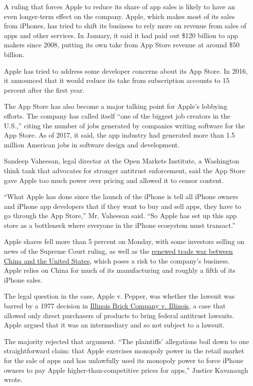 A ruling that forces Apple to reduce its share of app sales is likely to
have an even longer-term effect on the company. Apple, which makes most
of its sales from iPhones, has tried to shift its business to rely more
on revenue from sales of apps and other services. In January, it said it
had paid out \$120 billion to app makers since 2008, putting its own
take from App Store revenue at around \$50 billion.

Apple has tried to address some developer concerns about its App Store.
In 2016, it announced that it would reduce its take from subscription
accounts to 15 percent after the first year.

The App Store has also become a major talking point for Apple's lobbying
efforts. The company has called itself ``one of the biggest job creators
in the U.S.,'' citing the number of jobs generated by companies writing
software for the App Store. As of 2017, it said, the app industry had
generated more than 1.5 million American jobs in software design and
development.

Sandeep Vaheesan, legal director at the Open Markets Institute, a
Washington think tank that advocates for stronger antitrust enforcement,
said the App Store gave Apple too much power over pricing and allowed it
to censor content.

``What Apple has done since the launch of the iPhone is tell all iPhone
owners and iPhone app developers that if they want to buy and sell apps,
they have to go through the App Store,'' Mr. Vaheesan said. ``So Apple
has set up this app store as a bottleneck where everyone in the iPhone
ecosystem must transact.''

Apple shares fell more than 5 percent on Monday, with some investors
selling on news of the Supreme Court ruling, as well as the
\href{https://www.nytimes3xbfgragh.onion/2019/05/13/business/trump-trade-china.html}{renewed
trade war between China and the United States}, which poses a risk to
the company's business. Apple relies on China for much of its
manufacturing and roughly a fifth of its iPhone sales.

The legal question in the case, Apple v. Pepper, was whether the lawsuit
was barred by a 1977 decision in
\href{https://caselaw.findlaw.com/us-supreme-court/431/720.html}{Illinois
Brick Company v. Illinois}, a case that allowed only direct purchasers
of products to bring federal antitrust lawsuits. Apple argued that it
was an intermediary and so not subject to a lawsuit.

The majority rejected that argument. ``The plaintiffs' allegations boil
down to one straightforward claim: that Apple exercises monopoly power
in the retail market for the sale of apps and has unlawfully used its
monopoly power to force iPhone owners to pay Apple
higher-than-competitive prices for apps,'' Justice Kavanaugh wrote.

